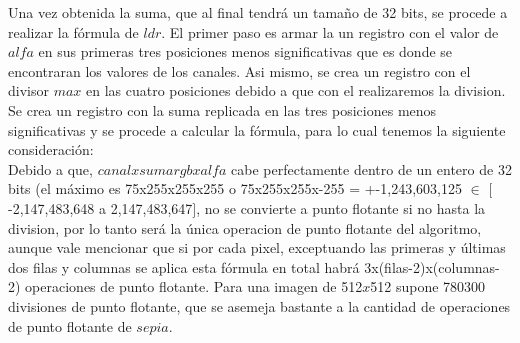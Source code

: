 Una vez obtenida la suma, que al final tendrá un tamaño de 32 bits, se procede a realizar la fórmula de $ldr$. 
El primer paso es armar la un registro con el valor de $alfa$ en sus primeras tres posiciones menos significativas que es donde se encontraran los valores de los canales. Asi mismo, se crea un registro con el divisor $max$ en las cuatro posiciones debido a que con el realizaremos la division.\\

Se crea un registro con la suma replicada en las tres posiciones menos significativas y se procede a calcular la fórmula, para lo cual tenemos la siguiente consideración:\\
 
Debido a que, $canal x sumargb x alfa$ cabe perfectamente dentro de un entero de 32 bits (el máximo es 75x255x255x255 o 75x255x255x-255 = +-1,243,603,125 $\in$ $[$-2,147,483,648 a 2,147,483,647$]$, no se convierte a punto flotante si no hasta la division, por lo tanto será la única operacion de punto flotante del algoritmo, aunque vale mencionar que si por cada pixel, exceptuando las primeras y últimas dos filas y columnas se aplica esta fórmula en total habrá 3x(filas-2)x(columnas-2) operaciones de punto flotante. Para una imagen de 512$x$512 supone 780300 divisiones de punto flotante, que se asemeja bastante a la cantidad de operaciones de punto flotante de $sepia$.


